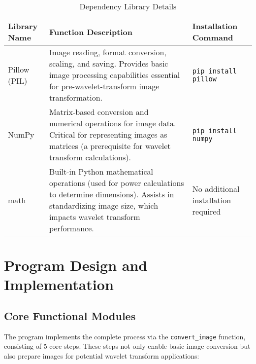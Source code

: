 \documentclass[12pt,a4paper]{article}
\begin{document}
\begin{table}[h]
\centering
\begin{tabular}{|>{\arraybackslash}p{2cm}|>{\arraybackslash}p{7cm}|>{\arraybackslash}p{3.5cm}|}
\hline
\textbf{Library Name} & \textbf{Function Description} & \textbf{Installation Command} \\
\hline
Pillow (PIL) & Image reading, format conversion, scaling, and saving. Provides basic image processing capabilities essential for pre-wavelet-transform image transformation. & \texttt{pip install pillow} \\
\hline
NumPy & Matrix-based conversion and numerical operations for image data. Critical for representing images as matrices (a prerequisite for wavelet transform calculations). & \texttt{pip install numpy} \\
\hline
math & Built-in Python mathematical operations (used for power calculations to determine dimensions). Assists in standardizing image size, which impacts wavelet transform performance. & No additional installation required \\
\hline
\end{tabular}
\caption{Dependency Library Details}
\end{table}


\section{Program Design and Implementation}
\subsection{Core Functional Modules}
The program implements the complete process via the \texttt{convert\_image} function, consisting of 5 core steps. These steps not only enable basic image conversion but also prepare images for potential wavelet transform applications:  
\end{document}
